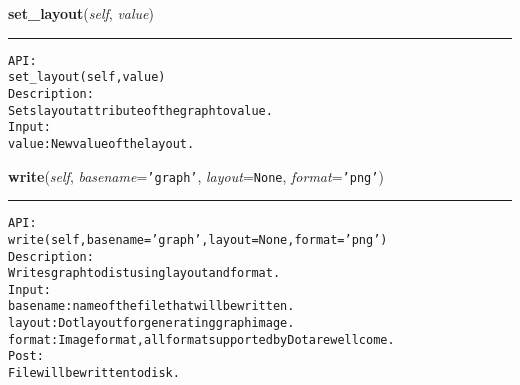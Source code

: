     \label{coinor:gimpy:graph:Graph:set_layout}

    \vspace{0.5ex}

\hspace{.8\funcindent}\begin{boxedminipage}{\funcwidth}

    \raggedright \textbf{set\_layout}(\textit{self}, \textit{value})

    \vspace{-1.5ex}

    \rule{\textwidth}{0.5\fboxrule}
\setlength{\parskip}{2ex}
\begin{alltt}

API:
    set\_layout(self, value)
Description:
Sets layout attribute of the graph to value.
Input:
    value: New value of the layout.
\end{alltt}

\setlength{\parskip}{1ex}
    \end{boxedminipage}

    \label{coinor:gimpy:graph:Graph:write}

    \vspace{0.5ex}

\hspace{.8\funcindent}\begin{boxedminipage}{\funcwidth}

    \raggedright \textbf{write}(\textit{self}, \textit{basename}={\tt \texttt{'}\texttt{graph}\texttt{'}}, \textit{layout}={\tt None}, \textit{format}={\tt \texttt{'}\texttt{png}\texttt{'}})

    \vspace{-1.5ex}

    \rule{\textwidth}{0.5\fboxrule}
\setlength{\parskip}{2ex}
\begin{alltt}

API:
    write(self, basename = 'graph', layout = None, format='png')
Description:
Writes graph to dist using layout and format.
Input:
    basename: name of the file that will be written.
    layout: Dot layout for generating graph image.
    format: Image format, all format supported by Dot are wellcome.
Post:
    File will be written to disk.
\end{alltt}

\setlength{\parskip}{1ex}
    \end{boxedminipage}

